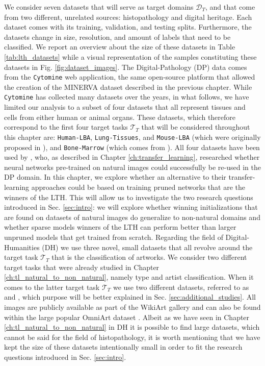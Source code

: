 We consider seven datasets that will serve as target domains $\mathcal{D}_T$, and that come from two different, unrelated sources: histopathology and digital heritage. Each dataset comes with its training, validation, and testing splits. Furthermore, the datasets change in size, resolution, and amount of labels that need to be classified. We report an overview about the size of these datasets in Table \ref{tab:lth_datasets} while a visual representation of the samples constituting these datasets in Fig. \ref{fig:dataset_images}.
The Digital-Pathology (DP) data comes from the \texttt{Cytomine} \cite{maree2016collaborative} web application, the same open-source platform that allowed the creation of the MINERVA dataset described in the previous chapter. While \texttt{Cytomine} has collected many datasets over the years, in what follows, we have limited our analysis to a subset of four datasets that all represent tissues and cells from either human or animal organs. These datasets, which therefore correspond to the first four target tasks $\mathcal{T}_T$ that will be considered throughout this chapter are: \texttt{Human-LBA}, \texttt{Lung-Tissues}, and \texttt{Mouse-LBA} (which were originally proposed in \cite{mormont2018comparison}), and \texttt{Bone-Marrow} (which comes from \cite{kainz2017training}). All four datasets have been used by \citet{mormont2018comparison}, who, as described in Chapter \ref{ch:transfer_learning}, researched whether neural networks pre-trained on natural images could successfully be re-used in the DP domain. In this chapter, we explore whether an alternative to their transfer-learning approaches could be based on training pruned networks that are the winners of the LTH. This will allow us to investigate the two research questions introduced in Sec. \ref{sec:intro}: we will explore whether winning initializations that are found on datasets of natural images do generalize to non-natural domains and whether sparse models winners of the LTH can perform better than larger unpruned models that get trained from scratch. 
Regarding the field of Digital-Humanities (DH) we use three novel, small datasets that all revolve around the target task $\mathcal{T}_T$ that is the classification of artworks. We consider two different target tasks that were already studied in Chapter \ref{ch:tl_natural_to_non_natural}, namely type and artist classification. When it comes to the latter target task $\mathcal{T}_T$ we use two different datasets, referred to as   and  , which purpose will be better explained in Sec. \ref{sec:additional_studies}. All images are publicly available as part of the WikiArt gallery \cite{phillips2011wiki} and can also be found within the large popular OmniArt dataset \cite{strezoski2018omniart}. Albeit as we have seen in Chapter \ref{ch:tl_natural_to_non_natural} in DH it is possible to find large datasets, which cannot be said for the field of histopathology, it is worth mentioning that we have kept the size of these datasets intentionally small in order to fit the research questions introduced in Sec. \ref{sec:intro}. 

